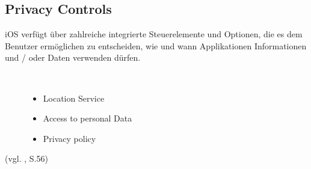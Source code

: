 \subsection{Privacy Controls}
\label{sec:PrivacyControls}
iOS verfügt über zahlreiche integrierte Steuerelemente und Optionen, die
es dem Benutzer ermöglichen zu entscheiden, wie und wann Applikationen
Informationen und / oder Daten verwenden dürfen. 
\begin{description}
    \item[\parbox{\textwidth} {Dies sind die Mainfeature von Apples
\glqq Privacy Controll\grqq{} Service} ]~\par
    \begin{itemize}
        \item Location Service
        \item Access to personal Data
        \item Privacy policy
    \end{itemize}
\end{description}

(vgl. \cite{Apple[4]}, S.56)